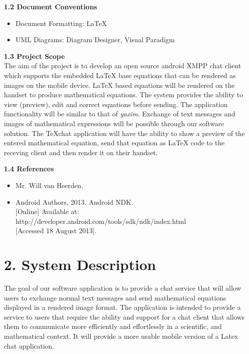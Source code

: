 \documentclass[29pt,a4paper]{moderncv}
\begin{document}
		\noindent \textbf{1.2 Document Conventions}
			\begin{itemize}
				\item Document Formatting: LaTeX
				\item UML Diagrams: Diagram Designer, Visual Paradigm
			\end{itemize}
		\vspace{5mm}
		
		\noindent \textbf{1.3 Project Scope}
			\\The aim of the project is to develop an open source android XMPP chat client which supports the embedded LaTeX base equations that can be rendered as images on the mobile device. LaTeX based equations will be rendered on the handset to produce mathematical equations. The system provides the ability to view (preview), edit and correct equations before sending.
			\parindent 5mm The application functionality will be similar to that of \textit{yaxim}. Exchange of text messages and images of mathematical expressions will be possible through our software solution. The TeXchat application will have the ability to show a preview of the entered mathematical equation, send that equation as LaTeX code to the receving client and then render it on their handset. 
			
		\vspace{5mm}
		
	\noindent \textbf{1.4 References}
		\begin{itemize}
		\item Mr. Will van Heerden.
		\item Android Authors, 2013. Android NDK.\\ {[Online]} Available at: http://developer.android.com/tools/sdk/ndk/index.html
			\\{[Accessed 18 August 2013].}
		\end{itemize}
		\vspace{5mm}
		
\newpage
	\section*{\textbf{2. System Description}}
	\vspace{4mm}
		\noindent The goal of our software application is to provide a chat service that will allow users to exchange normal text messages and send mathematical equations displayed in a rendered image format.  The application is intended to provide a service to users that require the ability and support for a chat client that allows them to communicate more efficiently and effortlessly in a scientific, and mathematical context. It will provide a more usable mobile version of a Latex chat application.\\ 
		
\end{document}
